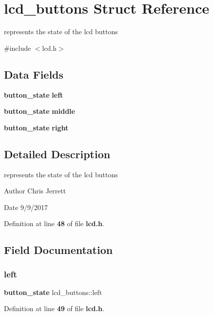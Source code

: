 \section{lcd\+\_\+buttons Struct Reference}
\label{structlcd__buttons}


represents the state of the lcd buttons  




{\ttfamily \#include $<$lcd.\+h$>$}

\subsection*{Data Fields}
\begin{DoxyCompactItemize}
\item 
\textbf{ button\+\_\+state} \textbf{ left}
\item 
\textbf{ button\+\_\+state} \textbf{ middle}
\item 
\textbf{ button\+\_\+state} \textbf{ right}
\end{DoxyCompactItemize}


\subsection{Detailed Description}
represents the state of the lcd buttons 

\begin{DoxyAuthor}{Author}
Chris Jerrett 
\end{DoxyAuthor}
\begin{DoxyDate}{Date}
9/9/2017 
\end{DoxyDate}


Definition at line \textbf{ 48} of file \textbf{ lcd.\+h}.



\subsection{Field Documentation}
\mbox{\label{structlcd__buttons_ae385efb5ec794acf5f11027f46c6c039}} 
\subsubsection{left}
{\footnotesize\ttfamily \textbf{ button\+\_\+state} lcd\+\_\+buttons\+::left}



Definition at line \textbf{ 49} of file \textbf{ lcd.\+h}.



